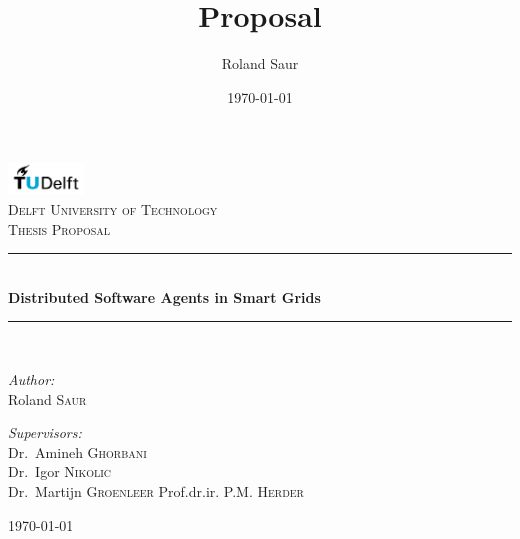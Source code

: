 \documentclass[a4paper]{article}
\title{Proposal}
\author{Roland Saur}
\date{\today}
\begin{document}
\begin{titlepage}

\begin{center}


\includegraphics[width=0.15\textwidth]{tud.png}\\[1cm]    

\textsc{\LARGE Delft University of Technology}\\[1.5cm]

\textsc{\Large Thesis Proposal}\\[0.5cm]


\newcommand{\HRule}{\rule{\linewidth}{0.5mm}}
\HRule \\[0.4cm]
{ \huge \bfseries Distributed Software Agents in Smart Grids}\\[0.4cm]

\HRule \\[1.5cm]

\begin{minipage}{0.4\textwidth}
\begin{flushleft} \large
\emph{Author:}\\
Roland \textsc{Saur}
\end{flushleft}
\end{minipage}
\hfill
\begin{minipage}{0.4\textwidth}
\begin{flushright} \large
\emph{Supervisors:} \\
Dr.~Amineh \textsc{Ghorbani} \\
Dr.~Igor \textsc{Nikolic} \\
Dr.~Martijn \textsc{Groenleer}
Prof.dr.ir. P.M. \textsc{Herder}  \\

\end{flushright}
\end{minipage}

\vfill

{\large \today}

\end{center}

\end{titlepage}
\newpage
\tableofcontents
\newpage
\listoffigures
\newpage
\end{document}
